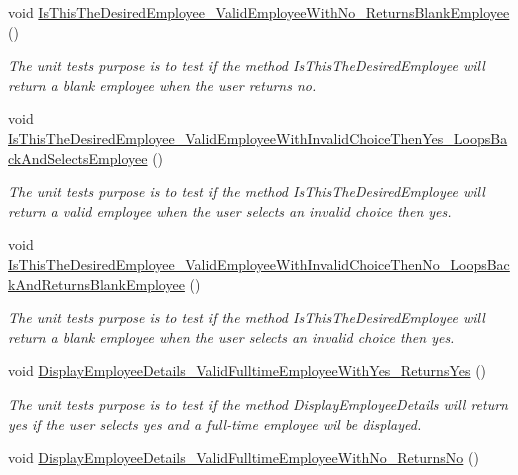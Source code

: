 \begin{DoxyCompactItemize}
void \hyperlink{class_the_company_1_1_tests_1_1_select_employee_tests_a63e57157205b8ddc40b72aab3115db9e}{Is\+This\+The\+Desired\+Employee\+\_\+\+Valid\+Employee\+With\+No\+\_\+\+Returns\+Blank\+Employee} ()
\begin{DoxyCompactList}\small\item\em The unit test\textquotesingle{}s purpose is to test if the method Is\+This\+The\+Desired\+Employee will return a blank employee when the user returns no. \end{DoxyCompactList}\item 
void \hyperlink{class_the_company_1_1_tests_1_1_select_employee_tests_a3690cb2818e17e840520cc7a104fa24d}{Is\+This\+The\+Desired\+Employee\+\_\+\+Valid\+Employee\+With\+Invalid\+Choice\+Then\+Yes\+\_\+\+Loops\+Back\+And\+Selects\+Employee} ()
\begin{DoxyCompactList}\small\item\em The unit test\textquotesingle{}s purpose is to test if the method Is\+This\+The\+Desired\+Employee will return a valid employee when the user selects an invalid choice then yes. \end{DoxyCompactList}\item 
void \hyperlink{class_the_company_1_1_tests_1_1_select_employee_tests_a3e44ec009e117d76c6c1fd9a7b614832}{Is\+This\+The\+Desired\+Employee\+\_\+\+Valid\+Employee\+With\+Invalid\+Choice\+Then\+No\+\_\+\+Loops\+Back\+And\+Returns\+Blank\+Employee} ()
\begin{DoxyCompactList}\small\item\em The unit test\textquotesingle{}s purpose is to test if the method Is\+This\+The\+Desired\+Employee will return a blank employee when the user selects an invalid choice then yes. \end{DoxyCompactList}\item 
void \hyperlink{class_the_company_1_1_tests_1_1_select_employee_tests_af52dc83ceb877d77f9ba3f0f80296427}{Display\+Employee\+Details\+\_\+\+Valid\+Fulltime\+Employee\+With\+Yes\+\_\+\+Returns\+Yes} ()
\begin{DoxyCompactList}\small\item\em The unit test\textquotesingle{}s purpose is to test if the method Display\+Employee\+Details will return yes if the user selects yes and a full-\/time employee wil be displayed. \end{DoxyCompactList}\item 
void \hyperlink{class_the_company_1_1_tests_1_1_select_employee_tests_ae7dd6ab75c7b439966bcea3c21532da6}{Display\+Employee\+Details\+\_\+\+Valid\+Fulltime\+Employee\+With\+No\+\_\+\+Returns\+No} ()

\end{DoxyCompactItemize}
